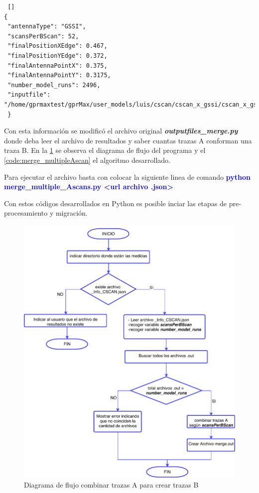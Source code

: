 \begin{lstlisting} []
{
 "antennaType": "GSSI", 
 "scansPerBScan": 52, 
 "finalPositionXEdge": 0.467, 
 "finalPositionYEdge": 0.372,
 "finalAntennaPointX": 0.375, 
 "finalAntennaPointY": 0.3175, 
 "number_model_runs": 2496, 
 "inputfile": "/home/gprmaxtest/gprMax/user_models/luis/cscan/cscan_x_gssi/cscan_x_gssi.in"
 }
\end{lstlisting}

Con esta información se modificó el archivo original \textbf{\textit{outputfiles\_merge.py}} donde deba leer el archivo  de resultados  y saber cuantas trazas A conforman una traza B. En la \figurename{ \ref{fig:merge_traces}} se observa el diagrama de flujo del programa y el \lstlistingname{  \ref{code:merge_multipleAscan}} el algoritmo desarrollado.

Para ejecutar el archivo basta con colocar la siguiente linea de comando \textcolor{blue}{\textbf{python merge\_multiple\_Ascans.py <url archivo .json>}}


Con estos códigos desarrollados en Python es posible inciar las etapas de pre-procesamiento  y migración.

\begin{figure}[H]
\centering
\includegraphics[height=\textheight-3.5cm,keepaspectratio]{chapter1/images/flujo_combinar_trazas.pdf}
\caption{Diagrama de flujo combinar trazas A para crear trazas B}
\label{fig:merge_traces}
\end{figure}



